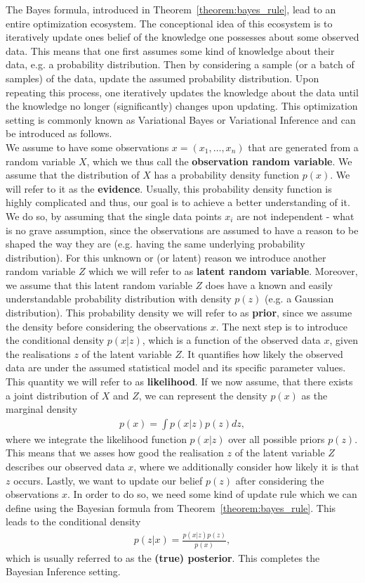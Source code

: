 The Bayes formula, introduced in Theorem~\ref{theorem:bayes_rule}, lead to an entire optimization ecosystem. The conceptional idea of this ecosystem is to iteratively update ones belief of the knowledge one possesses about some observed data. This means that one first assumes some kind of knowledge about their data, e.g. a probability distribution. Then by considering a sample (or a batch of samples) of the data, update the assumed probability distribution. Upon repeating this process, one iteratively updates the knowledge about the data until the knowledge no longer (significantly) changes upon updating. This optimization setting is commonly known as Variational Bayes or Variational Inference and can be introduced as follows.\\
We assume to have some observations $x=(x_1,\ldots, x_n)$ that are generated from a random variable $X$, which we thus call the \textbf{observation random variable}. We assume that the distribution of $X$ has a probability density function $p(x)$. We will refer to it as the \textbf{evidence}. Usually, this probability density function is highly complicated and thus, our goal is to achieve a better understanding of it. We do so, by assuming that the single data points $x_i$ are not independent - what is no grave assumption, since the observations are assumed to have a reason to be shaped the way they are (e.g. having the same underlying probability distribution). For this unknown or (or latent) reason we introduce another random variable $Z$ which we will refer to as \textbf{latent random variable}. Moreover, we assume that this latent random variable $Z$ does have a known and \glqq easily understandable\grqq{} probability distribution with density $p(z)$ (e.g. a Gaussian distribution). This probability density we will refer to as \textbf{prior}, since we assume the density before considering the observations $x$. The next step is to introduce the conditional density $p(x|z)$, which is a function of the observed data $x$, given the realisations $z$ of the latent variable $Z$. It quantifies how likely the observed data are under the assumed statistical model and its specific parameter values. This quantity we will refer to as \textbf{likelihood}. If we now assume, that there exists a joint distribution of $X$ and $Z$, we can represent the density $p(x)$ as the marginal density
\begin{align}\label{eq:evidence}
p(x) = \int p(x|z) p(z) dz,
\end{align}
where we integrate the likelihood function $p(x|z)$ over all possible priors $p(z)$. This means that we asses how good the realisation $z$ of the latent variable $Z$ describes our observed data $x$, where we additionally consider how likely it is that $z$ occurs. Lastly, we want to update our belief $p(z)$ after considering the observations $x$. In order to do so, we need some kind of update rule which we can define using the Bayesian formula from Theorem~\ref{theorem:bayes_rule}. This leads to the conditional density
\begin{align}\label{eq:posterior}
p(z|x) = \frac{p(x|z)p(z)}{p(x)},
\end{align}
which is usually referred to as the \textbf{(true) posterior}. This completes the Bayesian Inference setting.

